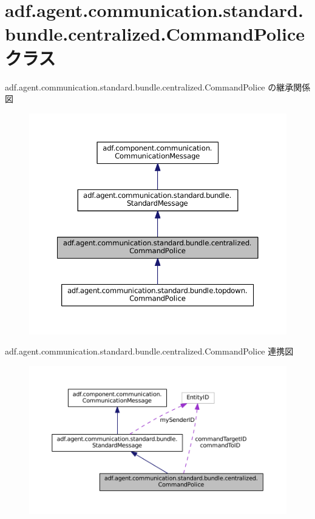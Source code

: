 \hypertarget{classadf_1_1agent_1_1communication_1_1standard_1_1bundle_1_1centralized_1_1CommandPolice}{}\section{adf.\+agent.\+communication.\+standard.\+bundle.\+centralized.\+Command\+Police クラス}
\label{classadf_1_1agent_1_1communication_1_1standard_1_1bundle_1_1centralized_1_1CommandPolice}


adf.\+agent.\+communication.\+standard.\+bundle.\+centralized.\+Command\+Police の継承関係図
\nopagebreak
\begin{figure}[H]
\begin{center}
\leavevmode
\includegraphics[width=350pt]{classadf_1_1agent_1_1communication_1_1standard_1_1bundle_1_1centralized_1_1CommandPolice__inherit__graph}
\end{center}
\end{figure}


adf.\+agent.\+communication.\+standard.\+bundle.\+centralized.\+Command\+Police 連携図
\nopagebreak
\begin{figure}[H]
\begin{center}
\leavevmode
\includegraphics[width=350pt]{classadf_1_1agent_1_1communication_1_1standard_1_1bundle_1_1centralized_1_1CommandPolice__coll__graph}
\end{center}
\end{figure}
